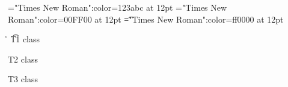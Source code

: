 \font\wzt="Times New Roman":color=123abc at 12pt
\font\zt="Times New Roman":color=00FF00 at 12pt
\font\t="Times New Roman":color=ff0000 at 12pt
 \r\n
\t T1 class 

\zt T2 class 

\wzt T3 class 


\bye
